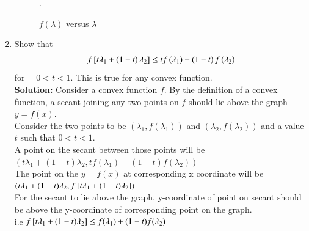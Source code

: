 \begin{enumerate}[label=\arabic*.,ref=\thesection.\theenumi]
\begin{figure}[!ht]
\caption{ $f(\lambda)$ versus $\lambda$}.
\label{fig:conv_def}	
\end{figure}
%
\item Show that
%
\begin{align}
\label{eq:convex_def}
f{}\left[t \lambda_1 + \left(1-t\right)\lambda_2\right] \leq 
t f\left(\lambda_1\right) + \left(1-t\right)f\left(\lambda_2\right)
\end{align}
%
for $\quad 0 < t < 1$.  This is true for any convex function.\\
%
\textbf{Solution: } Consider a convex function $f$. By the definition of a convex function, a secant joining any two points on $f$ should lie above the graph $y=f(x)$.\\
Consider the two points to be $(\lambda_1,f(\lambda_1))$ and $(\lambda_2,f(\lambda_2))$ and a value $t$ such that $0 < t < 1$.\\
A point on the secant between those points will be \\ 
$(t\lambda_1+(1-t)\lambda_2,t f(\lambda_1)+(1-t)f(\lambda_2))$ \\
The point on the $y=f(x)$ at corresponding x coordinate will be\\ 
$(t\lambda_1+(1-t)\lambda_2, f{}\left[t\lambda_1+(1-t)\lambda_2\right])$\\
For the secant to lie above the graph, y-coordinate of point on secant should be above the y-coordinate of corresponding point on the graph.\\
i.e $ f{}\left[t\lambda_1+(1-t)\lambda_2\right] \leq f(\lambda_1)+(1-t)f(\lambda_2)$


\end{enumerate}
